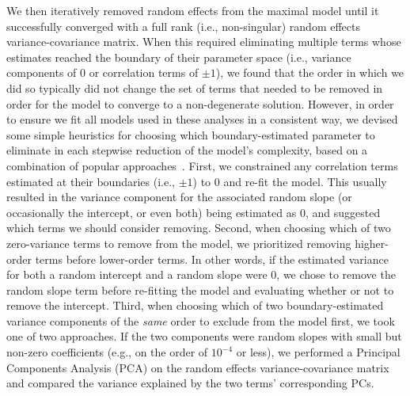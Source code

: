 \documentclass[10pt]{article}
\begin{document}
We then iteratively removed random effects from the maximal model until it successfully converged with a full rank (i.e., non-singular) random effects variance-covariance matrix. 
When this required eliminating multiple terms whose estimates reached the boundary of their parameter space (i.e., variance components of 0 or correlation terms of  $\pm 1$), we found that the order in which we did so typically did not change the set of terms that needed to be removed in order for the model to converge to a non-degenerate solution.
However, in order to ensure we fit all models used in these analyses in a consistent way, we devised some simple heuristics for choosing which boundary-estimated parameter to eliminate in each stepwise reduction of the model's complexity, based on a combination of popular approaches~\citep{BarrEtal13,BateEtal15b,MatuEtal17}.
First, we constrained any correlation terms estimated at their boundaries (i.e., $\pm 1$) to 0 and re-fit the model.
This usually resulted in the variance component for the associated random slope (or occasionally the intercept, or even both) being estimated as 0, and suggested which terms we should consider removing.
Second, when choosing which of two zero-variance terms to remove from the model, we prioritized removing higher-order terms before lower-order terms.
In other words, if the estimated variance for both a random intercept and a random slope were 0, we chose to remove the random slope term before re-fitting the model and evaluating whether or not to remove the intercept.
Third, when choosing which of two boundary-estimated variance components of the \textit{same} order to exclude from the model first, we took one of two approaches.
If the two components were random slopes with small but non-zero coefficients (e.g., on the order of $10^{-4}$ or less), we performed a Principal Components Analysis (PCA) on the random effects variance-covariance matrix and compared the variance explained by the two terms' corresponding PCs. 
\end{document}

